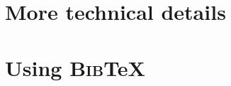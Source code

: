 \documentclass[article]{jss}
\begin{document}





\newpage

\begin{appendix}

\section{More technical details} \label{app:technical}

% 


\section[Using BibTeX]{Using \textsc{Bib}{\TeX}} \label{app:bibtex}


\end{appendix}
\end{document}
